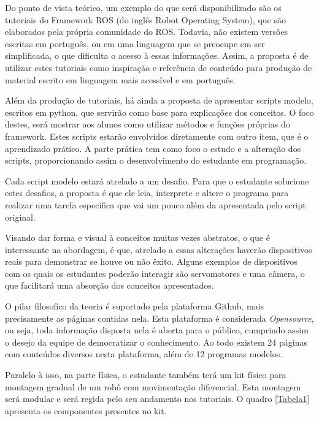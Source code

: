 Do ponto de vista teórico, um exemplo do que será disponibilizado são os tutoriais do Framework ROS (do inglês Robot Operating System), que são elaborados pela própria comunidade do ROS. Todavia, não existem versões escritas em português, ou em uma linguagem que se preocupe em ser simplificada, o que dificulta o acesso à essas informações. Assim, a proposta é de utilizar estes tutoriais como inspiração e referência de conteúdo para produção de material escrito em linguagem mais acessível e em português.

Além da produção de tutoriais, há ainda a proposta de apresentar scripts modelo, escritos em python, que servirão como base para explicações dos conceitos. O foco destes, será mostrar aos alunos como utilizar métodos e funções próprias do framework. Estes scripts estarão envolvidos diretamente com outro item, que é o aprendizado prático. A parte prática tem como foco o estudo e a alteração dos scripts, proporcionando assim o desenvolvimento do estudante em programação.

Cada script modelo estará atrelado a um desafio. Para que o estudante solucione estes desafios, a proposta é que ele leia, interprete e altere o programa para realizar uma tarefa específica que vai um pouco além da apresentada pelo script original.

Visando dar forma e visual à conceitos muitas vezes abstratos, o que é interessante na abordagem, é que, atrelado a essas alterações haverão dispositivos reais para demonstrar se houve ou não êxito. Alguns exemplos de dispositivos com os quais os estudantes poderão interagir são servomotores e uma câmera, o que
facilitará uma absorção dos conceitos apresentados.

O pilar filosofico da teoria é suportado pela plataforma Github, mais precisamente as páginas contidas nela. Esta plataforma é considerada  \textit{Opensource}, ou seja, toda informação disposta nela é aberta para o público, cumprindo assim o desejo da equipe de democratizar o conhecimento. Ao todo existem 24 páginas com conteúdos diversos nesta plataforma, além de 12 programas modelos.

Paralelo à isso, na parte física, o estudante também terá um kit físico para montagem gradual de um robô com movimentação diferencial. Esta montagem será modular e será regida pelo seu andamento nos tutoriais. O quadro \ref{Tabela1} apresenta os componentes presentes no kit.

